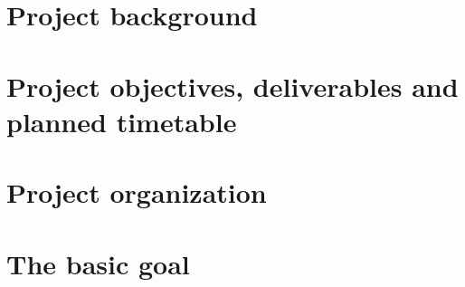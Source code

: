 \section{Project background}

\section{Project objectives, deliverables and planned timetable}

\section{Project organization}

\section{The basic goal}
